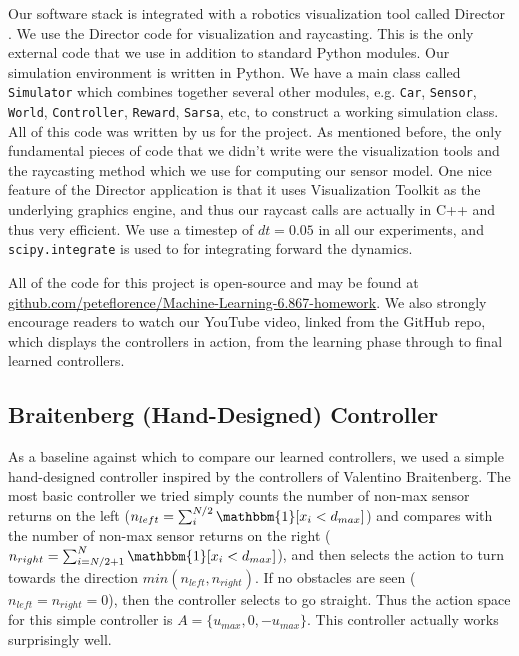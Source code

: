 \documentclass{article}
\def\code#1{\texttt{#1}}
\begin{document}
Our software stack is integrated with a robotics visualization tool called Director \cite{director}. We use the Director code for visualization and raycasting. This is the only external code that we use in addition to standard Python modules. Our simulation environment is written in Python. We have a main class called \code{Simulator} which combines together several other modules, e.g. \code{Car}, \code{Sensor}, \code{World}, \code{Controller}, \code{Reward}, \code{Sarsa}, etc, to construct a working simulation class. All of this code was written by us for the project. As mentioned before, the only fundamental pieces of code that we didn't write were the visualization tools and the raycasting method which we use for computing our sensor model. One nice feature of the Director application is that it uses Visualization Toolkit as the underlying graphics engine, and thus our raycast calls are actually in C++ and thus very efficient. We use a timestep of $dt = 0.05$ in all our experiments, and \code{scipy.integrate} is used to for integrating forward the dynamics.

All of the code for this project is open-source and may be found at \url{github.com/peteflorence/Machine-Learning-6.867-homework}.  We also strongly encourage readers to watch our YouTube video, linked from the GitHub repo, which displays the controllers in action, from the learning phase through to final learned controllers.

\subsection{Braitenberg (Hand-Designed) Controller}
\label{default_controller}
As a baseline against which to compare our learned controllers, we used a simple hand-designed controller inspired by the controllers of Valentino Braitenberg.  The most basic controller we tried simply counts the number of non-max sensor returns on the left ($n_{left} = \sum_i^{N/2} \mathbbm{1}[x_i < d_{max}]$) and compares with the number of non-max sensor returns on the right ($n_{right} = \sum_{i=N/2+1}^N \mathbbm{1}[x_i < d_{max}]$), and then selects the action to turn towards the direction $min(n_{left}, n_{right})$.  If no obstacles are seen ($n_{left} = n_{right} = 0$), then the controller selects to go straight.  Thus the action space for this simple controller is $A = \{u_{max}, 0, -u_{max} \}$.  This controller actually works surprisingly well.
\end{document}

